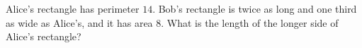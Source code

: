 Alice's rectangle has perimeter $14$. Bob's rectangle is twice as long and one third as wide as Alice's, and it has area $8$. What is the length of the longer side of Alice's rectangle?
